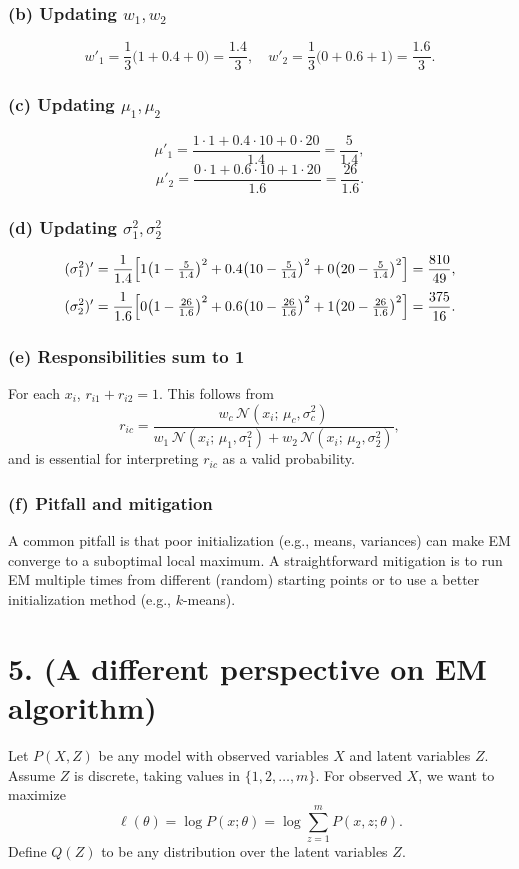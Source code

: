 \documentclass[twocolumn]{article}
\begin{document}
\begin{spacing}{1}
\subsubsection{(b) Updating $w_1, w_2$}
\[
w'_1 = \frac{1}{3}\bigl(1 + 0.4 + 0\bigr) = \frac{1.4}{3},\quad
w'_2 = \frac{1}{3}\bigl(0 + 0.6 + 1\bigr) = \frac{1.6}{3}.
\]

\subsubsection{(c) Updating $\mu_1, \mu_2$}
\[
\mu'_1 = \frac{1\cdot 1 + 0.4\cdot 10 + 0\cdot 20}{1.4} = \frac{5}{1.4}, \]
\[
\mu'_2 = \frac{0\cdot 1 + 0.6\cdot 10 + 1\cdot 20}{1.6} = \frac{26}{1.6}.
\]

\subsubsection{(d) Updating $\sigma_1^2, \sigma_2^2$}
\[
(\sigma_1^2)' = \frac{1}{1.4}\Bigl[
1\bigl(1 - \tfrac{5}{1.4}\bigr)^2
+ 0.4\bigl(10 - \tfrac{5}{1.4}\bigr)^2
+ 0\bigl(20 - \tfrac{5}{1.4}\bigr)^2
\Bigr] = \frac{810}{49},
\]
\[
(\sigma_2^2)' = \frac{1}{1.6}\Bigl[
0\bigl(1 - \tfrac{26}{1.6}\bigr)^2
+ 0.6\bigl(10 - \tfrac{26}{1.6}\bigr)^2
+ 1\bigl(20 - \tfrac{26}{1.6}\bigr)^2
\Bigr] = \frac{375}{16}.
\]

\subsubsection{(e) Responsibilities sum to 1}
For each $x_i$, $r_{i1} + r_{i2} = 1$. This follows from
\[
r_{ic}
= \frac{w_c \,\mathcal{N}(x_i;\,\mu_c, \sigma_c^2)}{w_1 \,\mathcal{N}(x_i;\,\mu_1, \sigma_1^2)
+ w_2 \,\mathcal{N}(x_i;\,\mu_2, \sigma_2^2)},
\]
and is essential for interpreting $r_{ic}$ as a valid probability.

\subsubsection{(f) Pitfall and mitigation}
A common pitfall is that poor initialization (e.g., means, variances) can make EM converge to a suboptimal local maximum. A straightforward mitigation is to run EM multiple times from different (random) starting points or to use a better initialization method (e.g., $k$-means).

\bigskip

\section{5. (A different perspective on EM algorithm)}
Let $P(X,Z)$ be any model with observed variables $X$ and latent variables $Z$. Assume $Z$ is discrete, taking values in $\{1,2,\dots,m\}$. For observed $X$, we want to maximize
\[
\ell(\theta) = \log P(x;\theta) = \log \sum_{z=1}^m P(x,z;\theta).
\]
Define $Q(Z)$ to be any distribution over the latent variables $Z$.


\end{spacing}
\end{document}
